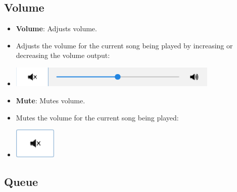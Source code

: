 \documentclass{article}
\begin{document}
\subsection{Volume}

\begin{itemize}
    \item \textbf{Volume}: Adjusts volume.
        \item[] Adjusts the volume for the current song being played by increasing or decreasing the volume output:
        \item[] \includegraphics[width=10cm]{Images/volume.png}
\end{itemize}

\begin{itemize}
    \item \textbf{Mute}: Mutes volume.
        \item[] Mutes the volume for the current song being played:
        \item[] \includegraphics[width=2cm]{Images/muteBtn.png}
\end{itemize}

\subsection{Queue}
\end{document}
